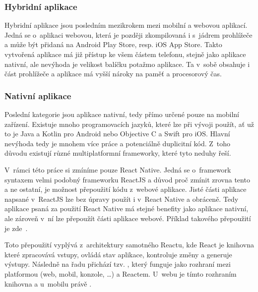\subsubsection*{Hybridní aplikace}
Hybridní aplikace jsou posledním mezikrokem mezi mobilní a webovou aplikací. Jedná se o~aplikaci webovou, která je později zkompilovaná i s~jádrem prohlížeče a může být přidaná na Android Play Store, resp. iOS App Store. Takto vytvořená aplikace má již přístup ke všem částem telefonu, stejně jako aplikace nativní, ale nevýhoda je velikost balíčku potažmo aplikace. Ta v~sobě obsahuje i část prohlížeče a aplikace má vyšší nároky na paměť a procesorový čas.

\subsubsection*{Nativní aplikace}
Poslední kategorie jsou aplikace nativní, tedy přímo určené pouze na mobilní zařízení. Existuje mnoho programovacích jazyků, které lze při vývoji použít, ať už to je Java a Kotlin pro Android nebo Objective C a Swift pro iOS. Hlavní nevýhoda tedy je mnohem více práce a potenciálně duplicitní kód. Z~toho důvodu existují různé multiplatformní frameworky, které tyto neduhy řeší.

V~rámci této práce si zmíníme pouze React Native. Jedná se o~framework syntaxem velmi podobný frameworku ReactJS a důvod proč zmínit zrovna tento a ne ostatní, je možnost přepoužití kódu z~webové aplikace. Jisté části aplikace napsané v~ReactJS lze bez úpravy použít i v~React Native a obráceně. Tedy aplikace psaná za použití React Native má stejné benefity jako aplikace nativní, ale zároveň v~ní lze přepoužít části aplikace webové. Příklad takového přepoužití je zde~\cite{sepulveda_2017_share}.

Toto přepoužití vyplývá z~architektury samotného Reactu, kde React je knihovna které zpracovává vstupy, ovládá stav aplikace, kontroluje změny a generuje výstupy. Následně na řadu přichází tzv. , který funguje jako rozhraní mezi platformou (web, mobil, konzole, \ldots{}) a Reactem. U~webu je tímto rozhraním knihovna  a u~mobilu právě .

